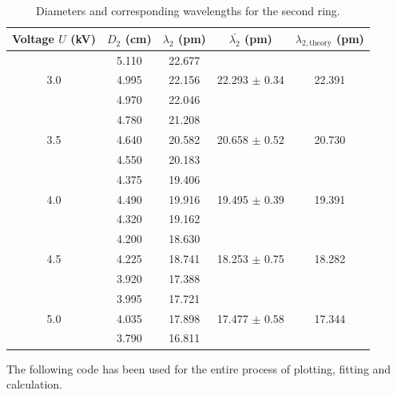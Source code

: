\documentclass[11pt]{article}
\begin{document}
        \begin{table}[H]
                \centering
                \caption{Diameters and corresponding wavelengths for the second ring.}
                \label{tab:ring_2}
                \begin{tabular}{c|c|c|c|c}\hline
                Voltage $U$ (kV) & $D_2$ (cm)    & $\lambda_2$ (pm)& $\bar{\lambda_2}$ (pm) &$\lambda_{2,\text{theory}}$ (pm) \\\hline\hline
                                 & 5.110         &  22.677         &                    &           \\
                3.0              & 4.995         &  22.156         & 22.293 $\pm$ 0.34  & 22.391    \\
                                 & 4.970         &  22.046         &                    &           \\\hline
                                 & 4.780         &  21.208         &                    &           \\
                3.5              & 4.640         &  20.582         & 20.658 $\pm$ 0.52  & 20.730    \\
                                 & 4.550         &  20.183         &                    &           \\\hline
                                 & 4.375         &  19.406         &                    &           \\
                4.0              & 4.490         &  19.916         & 19.495 $\pm$ 0.39  & 19.391    \\
                                 & 4.320         &  19.162         &                    &           \\\hline
                                 & 4.200         &  18.630         &                    &           \\
                4.5              & 4.225         &  18.741         & 18.253 $\pm$ 0.75  & 18.282    \\
                                 & 3.920         &  17.388         &                    &           \\\hline
                                 & 3.995         &  17.721         &                    &           \\
                5.0              & 4.035         &  17.898         & 17.477 $\pm$ 0.58  & 17.344    \\
                                 & 3.790         &  16.811         &                    &           \\\hline
                \end{tabular}
        \end{table}
        The following code has been used for the entire process of plotting, fitting and calculation.
        
        
\end{document}
